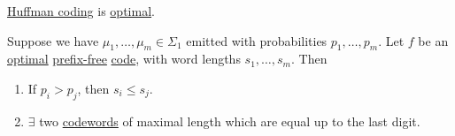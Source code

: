 \documentclass{article}
\newcommand{\1}[1]{\mathbbm{1}_{#1}}
\begin{document}
\begin{nthm}\label{thm:huffOpt}
    \hyperlink{def:huffmanCode}{Huffman coding} is \hyperlink{def:optCode}{optimal}.
\end{nthm}
\begin{nlemma}\label{lem:1.6}
    Suppose we have $\mu_1, \dotsc, \mu_m \in \Sigma_1$ emitted with probabilities $p_1, \dotsc, p_m$.
    Let $f$ be an \hyperlink{def:optCode}{optimal} \hyperlink{def:prefixFreeCode}{prefix-free} \hyperlink{def:code}{code}, with word lengths $s_1, \dotsc, s_m$.
    Then
    \begin{enumerate}[label=\roman*)]
        \item If $p_i > p_j$, then $s_i \leq s_j$.
        \item $\exists$ two \hyperlink{def:code}{codewords} of maximal length which are equal up to the last digit.
    \end{enumerate}
\end{nlemma}
\end{document}
